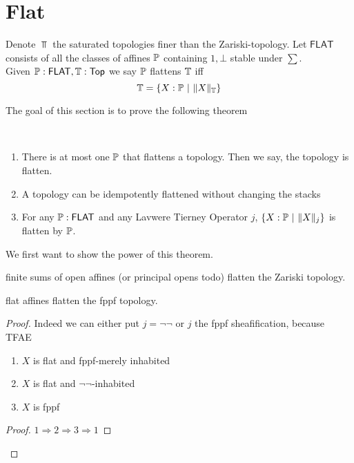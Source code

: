\section{Flat}


\begin{definition}
	Denote $\Top$ the saturated topologies finer than the Zariski-topology.
	Let $\mathsf{FLAT}$ consists of all the classes of affines $\mathbb{P}$ containing $1, \bot$ stable under $\sum$. \\
	Given $\mathbb{P}: \mathsf{FLAT} , \mathbb{T}: \operatorname{\mathsf{Top}}$ we say $\mathbb{P}$ flattens $\mathbb{T}$ iff 
	\[
	\mathbb{T}= \{X : \mathbb{P}\ | \ \|X\|_{\mathbb{T}} \}
	\]
\end{definition}
The goal of this section is to prove the following theorem
\begin{theorem}{\label{thm:Flat}}
 \
	\begin{enumerate}
		\item There is at most one $\mathbb{P}$ that flattens a topology. Then we say, the topology is flatten.
		\item A topology can be idempotently flattened without changing the stacks
		\item For any $\mathbb{P}: \mathsf{FLAT}$ and any Lavwere Tierney Operator $j$, $\{ X: \mathbb{P} \ | \ \|X\|_j \}$ is flatten by $\mathbb{P}$.
	\end{enumerate}
\end{theorem}
We first want to show the power of this theorem.
\begin{example}
	finite sums of open affines (or principal opens todo) flatten the Zariski topology. 
\end{example}
\begin{example}
	flat affines flatten the fppf topology. %
\end{example}
\begin{proof}
	Indeed we can either put $j = \lnot \lnot$ or $j$ the fppf sheafification, because TFAE
	\begin{enumerate}
		\item  $X$ is flat and fppf-merely inhabited
		\item $X$ is flat  and $\lnot\lnot$-inhabited
		\item $X$ is fppf
	\end{enumerate}
	
	\begin{proof}
		$1 \Rightarrow 2 \Rightarrow 3 \Rightarrow 1$ \todocite
	\end{proof}	 
\end{proof}
